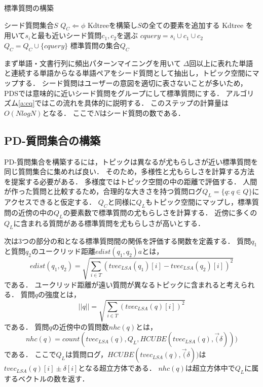 \documentclass[master]{suribt}
\theoremstyle{definition}
\begin{document}
 \begin{algorithm}
 \caption{標準質問の構築}
 \begin{algorithmic}[1]
  \Require シード質問集合$S$
  \State $Q_C \Leftarrow \phi$
  \State Kdtreeを構築し$S$の全ての要素を追加する
  \State Kdtree を用いて$s_i$と最も近いシード質問$c_1,c_2$を選ぶ
  \State $cquery = s_i \cup c_1 \cup c_2$
  \State $Q_C = Q_C \cup \{cquery\}$
  \EndIf
  \EndFor
  \Ensure 標準質問の集合$Q_C$
 \end{algorithmic}
 \label{a:cq}
 \end{algorithm}

 まず単語・文書行列に頻出パターンマイニング\cite{}を用いて
 $\Delta$回以上に表れた単語と連続する単語からなる単語ペアをシード質問として抽出し，トピック空間にマップする．
 シード質問はユーザーの意図を適切に表さないことが多いため，
 PDSでは意味的に近いシード質問をグループにして標準質問にする．
 アルゴリズム\ref{a:cq}ではこの流れを具体的に説明する．
 このステップの計算量は$O(NlogN)$となる．
 ここで$N$はシード質問の数である．

 \subsection{PD-質問集合の構築}
 PD-質問集合を構築するには，トピックは異なるが尤もらしさが近い標準質問を同じ質問集合に集めれば良い．
 そのため，多様性と尤もらしさを計算する方法を提案する必要がある．
 多様度ではトピック空間の中の距離で評価する．
 人間が作った質問と比較するため，合理的な大きさを持つ質問ログ$Q_L = \{q: q \in Q\}$にアクセスできると仮定する．
 $Q_C$と同様に$Q_L$もトピック空間にマップし，標準質問の近傍の中の$Q_L$の要素数で標準質問の尤もらしさを計算する．
 近傍に多くの$Q_L$に含まれる質問がある標準質問を尤もらしさが高いとする．

 次は3つの部分の和となる標準質問間の関係を評価する関数を定義する．
 質問$q_1$と質問$q_2$のユークリッド距離$edist(q_1,q_2)a$とは，
 \begin{equation}
 edist(q_1,q_2) = \sqrt{\sum_{i \in T}(tvec_{LSA}(q_1)[i] - tvec_{LSA}(q_2)[i])^2}
 \end{equation}
 である．
 ユークリッド距離が遠い質問が異なるトピックに含まれると考えられる．
 質問$q$の強度とは，
 \begin{equation}
 ||q|| = \sqrt{\sum_{i \in T}(tvec_{LSA}(q)[i])^2}
 \end{equation}
 である．
 質問$q$の近傍中の質問数$nhc(q)$とは，
 \begin{equation}
 nhc(q) = count(tvec_{LSA}(q),Q_L,HCUBE(tvec_{LSA}(q),\vec(\delta)))
 \end{equation}
 である．
 ここで$Q_L$は質問ログ，$HCUBE(tvec_{LSA}(q),\vec(\delta))$は$tvec_{LSA}(q)[i] \pm \delta[i]$となる超立方体である．
 $nhc(q)$は超立方体中で$Q_L$に属するベクトルの数を返す．
 
\end{document}
